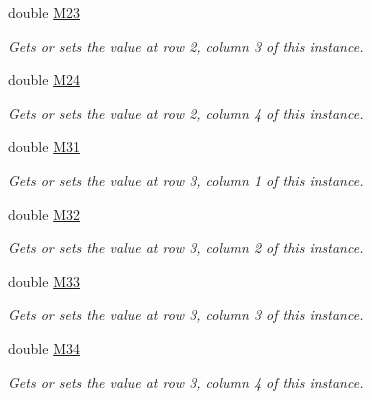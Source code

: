 \begin{DoxyCompactItemize}
double \hyperlink{struct_open_t_k_1_1_matrix4d_a53f4f587ab0a2f21f311d701443087be}{M23}
\begin{DoxyCompactList}\small\item\em Gets or sets the value at row 2, column 3 of this instance. \end{DoxyCompactList}\item 
double \hyperlink{struct_open_t_k_1_1_matrix4d_aa393e28192768f91e94b57968153eba4}{M24}
\begin{DoxyCompactList}\small\item\em Gets or sets the value at row 2, column 4 of this instance. \end{DoxyCompactList}\item 
double \hyperlink{struct_open_t_k_1_1_matrix4d_aa2d05b2c70e0fc88927bd1ae8951c52c}{M31}
\begin{DoxyCompactList}\small\item\em Gets or sets the value at row 3, column 1 of this instance. \end{DoxyCompactList}\item 
double \hyperlink{struct_open_t_k_1_1_matrix4d_a98f2e04b921569d28fb548e283a6f640}{M32}
\begin{DoxyCompactList}\small\item\em Gets or sets the value at row 3, column 2 of this instance. \end{DoxyCompactList}\item 
double \hyperlink{struct_open_t_k_1_1_matrix4d_a1f6a33102447d3e336d765015233cb6a}{M33}
\begin{DoxyCompactList}\small\item\em Gets or sets the value at row 3, column 3 of this instance. \end{DoxyCompactList}\item 
double \hyperlink{struct_open_t_k_1_1_matrix4d_a744e9492a99b731d3d8065f1f0049059}{M34}
\begin{DoxyCompactList}\small\item\em Gets or sets the value at row 3, column 4 of this instance. \end{DoxyCompactList}\item 

\end{DoxyCompactItemize}
